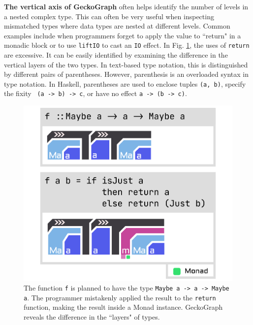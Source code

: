 \documentclass[preprint,12pt]{elsarticle}
\begin{document}
\textbf{The vertical axis of GeckoGraph} often helps identify the number of levels in a nested complex type. This can often be very useful when inspecting mismatched types where data types are nested at different levels. Common examples include when programmers forget to apply the value to ``return" in a monadic block or to use \texttt{liftIO} to cast an \texttt{IO} effect. In Fig. \ref{fig:maybe}, the uses of \texttt{return} are excessive. It can be easily identified by examining the difference in the vertical layers of the two types. In text-based type notation, this is distinguished by different pairs of parentheses. However, parenthesis is an overloaded syntax in type notation. In Haskell, parentheses are used to enclose tuples \texttt{(a, b)}, specify the fixity \texttt{ (a -> b) -> c}, or have no effect \texttt{a -> (b -> c)}.

	
\begin{figure}
  \includegraphics[width=0.6\linewidth]{figures/Maybe}
  \caption{\label{fig:maybe} The function \texttt{f} is planned to have the type \texttt{Maybe a -> a -> Maybe a}. The programmer mistakenly applied the result to the \texttt{return} function, making the result inside a Monad instance.  GeckoGraph reveals the difference in the ``layers" of types. }
\end{figure}
\end{document}
